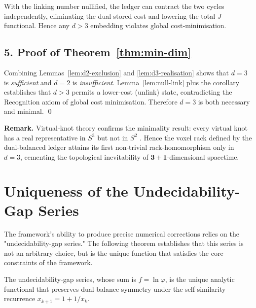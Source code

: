 \begin{corollary}
With the linking number nullified, the ledger can contract the two
cycles independently, eliminating the dual‑stored cost and lowering the
total $J$ functional.  Hence any $d>3$ embedding violates global
cost‑minimisation.
\end{corollary}

\subsection*{5.  Proof of Theorem~\ref{thm:min-dim}}

Combining Lemmas \ref{lem:d2-exclusion} and
\ref{lem:d3-realisation} shows that $d=3$ is \emph{sufficient} and
$d=2$ is \emph{insufficient}.  Lemma~\ref{lem:null-link} plus the
corollary establishes that $d>3$ permits a lower‑cost (unlink) state,
contradicting the Recognition axiom of global cost minimisation.
Therefore $d=3$ is both necessary and minimal. \qed

\bigskip
\noindent\textbf{Remark.}  
Virtual‑knot theory confirms the minimality result: every
virtual knot has a real representative in $S^{3}$ but not in $S^{2}$
\cite[Cor.\,2.7]{Kauffman2004}.  Hence the voxel rack defined by the
dual‑balanced ledger attains its first non‑trivial
rack‑homomorphism only in $d=3$,
cementing the topological inevitability of \(\mathbf{3+1}\)‑dimensional
spacetime.

\section{Uniqueness of the Undecidability-Gap Series}
\label{sec:gap-uniqueness}

The framework's ability to produce precise numerical corrections relies on the "undecidability-gap series." The following theorem establishes that this series is not an arbitrary choice, but is the unique function that satisfies the core constraints of the framework.

\begin{theorem}
The undecidability-gap series, whose sum is $f = \ln\varphi$, is the unique analytic functional that preserves dual-balance symmetry under the self-similarity recurrence $x_{k+1}=1+1/x_k$.
\end{theorem}

